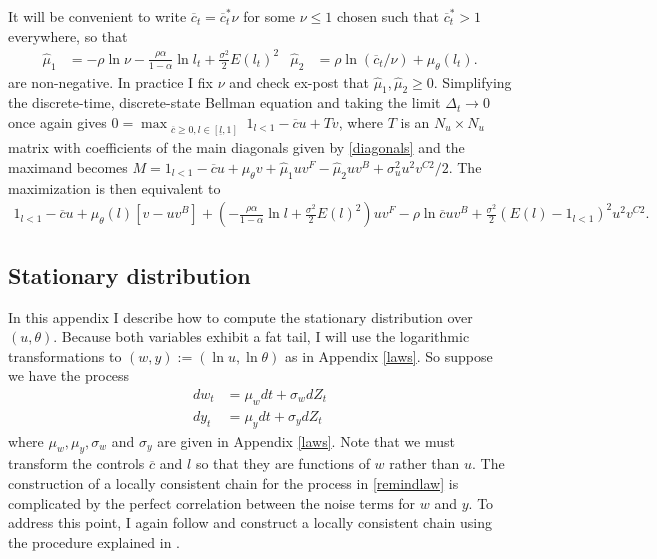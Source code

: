 \documentclass[11pt]{article}
\theoremstyle{plain}
\begin{document}
It will be convenient to write $\overline{c}_t = \overline{c}^*_t\nu$ for some $\nu \leq 1$ chosen such that $\overline{c}_t^* > 1$ everywhere, so that 
\begin{align*} 
\hat{\mu}_1 & = -\rho \ln \nu - \frac{\rho\alpha}{1-\alpha} \ln l_t + \frac{\sigma^2}{2}E(l_t)^2 &
\hat{\mu}_2 & = \rho \ln (\overline{c}_t/\nu) + \mu_{\theta}(l_t).
\end{align*}
are non-negative. In practice I fix $\nu$ and check ex-post that $\hat{\mu}_1, \hat{\mu}_2 \geq 0$. Simplifying the discrete-time, discrete-state Bellman equation and taking the limit $\Delta_t \rightarrow 0$ once again gives $0 = \max_{\substack{\overline{c} \geq 0, l \in [\underline{l},1]}} 1_{l<1} - \overline{c}u + Tv$, where $T$ is an $N_u \times N_u$ matrix with coefficients of the main diagonals given by \eqref{diagonals} and the maximand becomes $M = 1_{l<1} - \overline{c}u + \mu_{\theta}v + \hat{\mu}_1uv^F - \hat{\mu}_2uv^B + \sigma_u^2u^2v^{C2}/2$. The maximization is then equivalent to 
\begin{align*}
1_{l<1} - \overline{c}u + \mu_{\theta}(l)[v - uv^B] + {\left(- \frac{\rho\alpha}{1-\alpha} \ln l + \frac{\sigma^2}{2}E(l)^2 \right)}uv^F - \rho \ln \overline{c}uv^B + \frac{\sigma^2}{2} (E(l) - 1_{l<1})^2u^2v^{C2}.
\end{align*}


\subsection{Stationary distribution}

In this appendix I describe how to compute the stationary distribution over $(u,\theta)$. Because both variables exhibit a fat tail, I will use the logarithmic transformations to $(w, y) := (\ln u, \ln \theta)$ as in Appendix \ref{laws}. So suppose we have the process
\begin{equation}
\begin{aligned}
dw_t & = \mu_wdt + \sigma_wdZ_t
\\ dy_t & = \mu_ydt + \sigma_ydZ_t
\end{aligned}
\label{remindlaw}
\end{equation}
where $\mu_w, \mu_y, \sigma_w$ and $\sigma_y$ are given in Appendix \ref{laws}. Note that we must transform the controls $\overline{c}$ and $l$ so that they are functions of $w$ rather than $u$. The construction of a locally consistent chain for the process in \eqref{remindlaw} is complicated by the perfect correlation between the noise terms for $w$ and $y$. To address this point, I again follow \cite{kushner_numerical_2001} and construct a locally consistent chain using the procedure explained in \cite{phelan_applications_2022}. 
\end{document}
